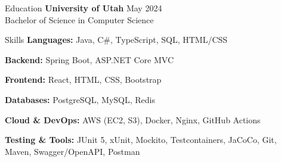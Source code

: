 \documentclass{resume}
\begin{document}
\begin{rSection}{Education}
\vspace{-0.3em}
\textbf{University of Utah} \hfill May 2024 \\
Bachelor of Science in Computer Science
\end{rSection}

\begin{rSection}{Skills}
\vspace{-0.3em}
\textbf{Languages:} Java, C\#, TypeScript, SQL, HTML/CSS

\textbf{Backend:} Spring Boot, ASP.NET Core MVC

\textbf{Frontend:} React, HTML, CSS, Bootstrap

\textbf{Databases:} PostgreSQL, MySQL, Redis

\textbf{Cloud \& DevOps:} AWS (EC2, S3), Docker, Nginx, GitHub Actions

\textbf{Testing \& Tools:} JUnit 5, xUnit, Mockito, Testcontainers, JaCoCo, Git, Maven, Swagger/OpenAPI, Postman
\end{rSection}
\end{document}
